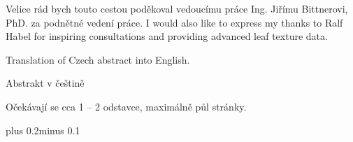 \documentclass[11pt,twoside,a4paper]{book}
\begin{document}

\coverpagestarts


\acknowledgements
\noindent
Velice rád bych touto cestou poděkoval vedoucímu práce Ing. Jiřímu Bittnerovi, PhD. za podnětné vedení práce.
\newline I would also like to express my thanks to Ralf Habel for inspiring consultations and providing advanced leaf texture data.






 
\abstractpage

Translation of Czech abstract into English.


\baselineskip

\noindent
Abstrakt v češtině

\noindent
Očekávají se cca 1 -- 2 odstavce, maximálně půl stránky.


\tableofcontents



\mainbodystarts
\normalfont
{}\baselineskip plus 0.2\baselineskip minus 0.1\baselineskip



% 
% 
\end{document}
